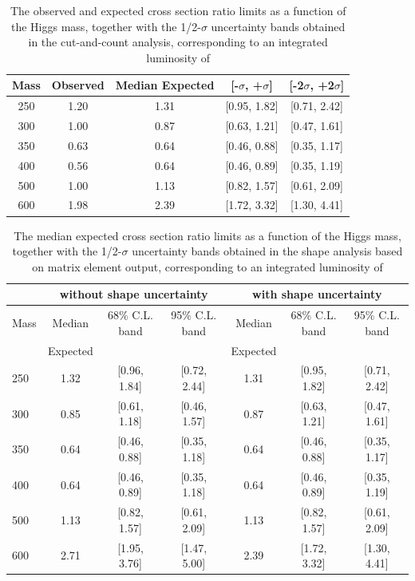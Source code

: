 \begin{table}[!ht]
\begin{center}
\begin{tabular}{ccccc}
\hline\hline
Mass & Observed & Median Expected & [-$\sigma$, +$\sigma$] & [-2$\sigma$, +2$\sigma$]\\\hline
250 & 1.20 & 1.31 & [0.95, 1.82] & [0.71, 2.42] \\
300 & 1.00 & 0.87 & [0.63, 1.21] & [0.47, 1.61] \\
350 & 0.63 & 0.64 & [0.46, 0.88] & [0.35, 1.17] \\
400 & 0.56 & 0.64 & [0.46, 0.89] & [0.35, 1.19] \\
500 & 1.00 & 1.13 & [0.82, 1.57] & [0.61, 2.09] \\
600 & 1.98 & 2.39 & [1.72, 3.32] & [1.30, 4.41] \\
\hline\hline
\end{tabular}
\end{center}
\caption{The observed and expected cross section ratio limits as a function 
of the Higgs mass, together with the 1/2-$\sigma$ uncertainty bands obtained in the cut-and-count analysis, corresponding to 
an integrated luminosity of \intlumi}
\label{tab:limits_meshape_5fb}
\end{table}


\begin{table}
\begin{center}
{\normalsize
\begin{tabular}{|l|c|c|c|c|c|c|}
\hline
      &  \multicolumn{3}{c|}{ without shape uncertainty} &\multicolumn{3}{c|}{ with shape uncertainty} \\
\hline
Mass  &  Median      &     68\% C.L. band &  95\% C.L. band &  Median	   &	 68\% C.L. band &  95\% C.L. band\\
      &  Expected    &                    &                 &  Expected    &			&		 \\
\hline
250 & 1.32 & [0.96, 1.84] & [0.72, 2.44] & 1.31 & [0.95, 1.82] & [0.71, 2.42] \\
300 & 0.85 & [0.61, 1.18] & [0.46, 1.57] & 0.87 & [0.63, 1.21] & [0.47, 1.61] \\
350 & 0.64 & [0.46, 0.88] & [0.35, 1.18] & 0.64 & [0.46, 0.88] & [0.35, 1.17] \\
400 & 0.64 & [0.46, 0.89] & [0.35, 1.18] & 0.64 & [0.46, 0.89] & [0.35, 1.19] \\
500 & 1.13 & [0.82, 1.57] & [0.61, 2.09] & 1.13 & [0.82, 1.57] & [0.61, 2.09] \\
600 & 2.71 & [1.95, 3.76] & [1.47, 5.00] & 2.39 & [1.72, 3.32] & [1.30, 4.41] \\
\hline
\end{tabular}
}
\end{center}
\caption{The median expected cross section ratio limits as a function 
of the Higgs mass, together with the 1/2-$\sigma$ uncertainty bands obtained in the shape analysis based on matrix element output, 
corresponding to an integrated luminosity of \intlumi}
\label{tab:limits_meshape_uncert_5fb}
\end{table}


